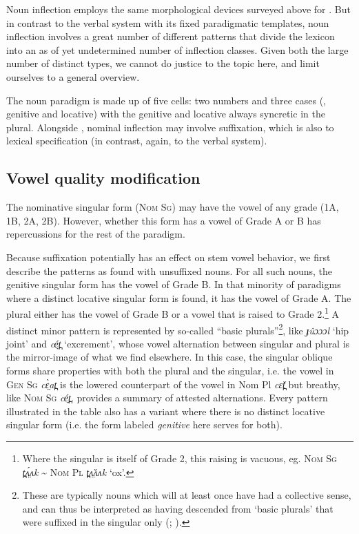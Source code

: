 \documentclass[output=paper,newtxmath,modfonts,nonflat,draftmode]{langsci/langscibook}
\begin{document}
Noun inflection employs the same morphological devices surveyed above for . But in contrast to the verbal system with its fixed paradigmatic templates, noun inflection involves a great number of different patterns that divide the lexicon into an as of yet undetermined number of inflection classes. Given both the large number of distinct types, we cannot do justice to the topic here, and limit ourselves to a general overview.

The noun paradigm is made up of five cells: two numbers and three cases (, genitive and locative) with the genitive and locative always syncretic in the plural. Alongside , nominal inflection may involve suffixation, which is also  to lexical specification (in contrast, again, to the verbal system). 

\subsection{Vowel quality modification} 

The nominative singular form (\textsc{Nom Sg}) may have the vowel of any grade (1A, 1B, 2A, 2B). However, whether this form has a vowel of Grade A or B has repercussions for the rest of the paradigm. 

Because suffixation potentially has an effect on stem vowel behavior, we first describe the patterns as found with unsuffixed nouns. For all such nouns, the genitive singular form has the vowel of Grade B. In that minority of paradigms where a distinct locative singular form is found, it has the vowel of Grade A. The plural either has the vowel of Grade B or a vowel that is raised to Grade 2.\footnote{Where\label{fn:monich:11} the singular is itself of Grade 2, this raising is vacuous, eg. \textsc{Nom Sg} \textit{t̪ʌ̤́ʌk} {\textasciitilde} \textsc{Nom Pl} \textit{t̪ʌ̤̌ʌʌk} ‘ox’.}  A distinct minor pattern is represented by so-called “basic plurals”\footnote{These\label{fn:monich:12} are typically nouns which will at least once have had a collective sense, and can thus be interpreted as having descended from ‘basic plurals’ that were suffixed in the singular only (\citealt{Storch2005}; \citealt{Dimmendaal2000}).}, like \textit{ɟûɔɔɔl} ‘hip joint’ and \textit{cé̤t̪} ‘excrement’, whose vowel alternation between  singular and plural is the mirror-image of what we find elsewhere. In this case, the singular oblique forms share properties with both the  plural and the  singular, i.e. the vowel in \textsc{Gen Sg} \textit{cɛ̤̀at̪} is the lowered counterpart of the vowel in Nom Pl \textit{cɛ̌t̪} but breathy, like \textsc{Nom Sg} \textit{cé̤t̪}.  provides a summary of attested  alternations. Every pattern illustrated in the table also has a variant where there is no distinct locative singular form (i.e. the form labeled \textit{genitive} here serves for both).
\end{document}
